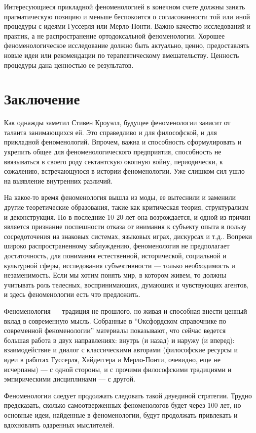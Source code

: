\documentclass[11pt]{book}
\begin{document}
Интересующиеся прикладной феноменологией в конечном счете должны занять прагматическую позицию и меньше беспокоится о согласованности той или иной процедуры с идеями Гуссерля или Мерло-Понти. Важно качество исследований и практик, а не распространение ортодоксальной феноменологии. Хорошее феноменологическое исследование должно быть актуально, ценно, предоставлять новые идеи или рекомендации по терапевтическому вмешательству. Ценность процедуры дана ценностью ее результатов.

\chapter{Заключение}

Как однажды заметил Стивен Кроуэлл, будущее феноменологии зависит от таланта занимающихся ей. Это справедливо и для философской, и для прикладной феноменологий. Впрочем, важна и способность сформулировать и укрепить общее для феноменологического предприятия, способность не ввязываться в своего роду сектантскую окопную войну, периодически, к сожалению, встречающуюся в истории феноменологии. Уже слишком сил ушло на выявление внутренних различий.

На какое-то время феноменология вышла из моды, ее вытеснили и заменили другие теоретические образования, такие как критическая теория, структурализм и деконструкция. Но в последние 10-20 лет она возрождается, и одной из причин является признание поспешности отказа от внимания к субъекту опыта в пользу сосредоточения на знаковых системах, языковых играх, дискурсах и т.д.. Вопреки широко распространенному заблуждению, феноменология не предполагает достаточность, для понимания естественной, исторической, социальной и культурной сферы, исследования субъективности --- только необходимость и незаменимость. Если мы хотим понять мир, в котором живем, то должны учитывать роль телесных, воспринимающих, думающих и чувствующих агентов, и здесь феноменологии есть что предложить.

Феноменология --- традиция не прошлого, но живая и способная внести ценный вклад в современную мысль. Собранные в ''Оксфордском справочнике по современной феноменологии'' материалы показывают, что сейчас ведется большая работа в двух направлениях: внутрь (и назад) и наружу (и вперед): взаимодействие и диалог с классическими авторами (философские ресурсы и идеи в работах Гуссерля, Хайдеггера и Мерло-Понти, очевидно, еще не исчерпаны) --- с одной стороны, и с прочими философскими традициями и эмпирическими дисциплинами --- с другой.

Феноменологии следует продолжать следовать такой двуединой стратегии. Трудно предсказать, сколько самоотверженных феноменологов будет через 100 лет, но основные идеи, найденные в феноменологии, будут продолжать привлекать и вдохновлять одаренных мыслителей.
\end{document}
